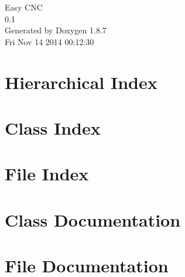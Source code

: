 \documentclass[twoside]{book}
\newcommand{\+}{\discretionary{\mbox{\scriptsize$\hookleftarrow$}}{}{}}
\newcommand{\clearemptydoublepage}{%
  \newpage{\pagestyle{empty}\cleardoublepage}%
}
\begin{document}
\hypersetup{pageanchor=false,
             bookmarks=true,
             bookmarksnumbered=true,
             pdfencoding=unicode
            }
\begin{titlepage}
\vspace*{7cm}
\begin{center}%
{\Large Easy C\+N\+C \\[1ex]\large 0.\+1 }\\
\vspace*{1cm}
{\large Generated by Doxygen 1.8.7}\\
\vspace*{0.5cm}
{\small Fri Nov 14 2014 00:12:30}\\
\end{center}
\end{titlepage}
\clearemptydoublepage
\tableofcontents
\clearemptydoublepage
{}
\hypersetup{pageanchor=true}

\chapter{Hierarchical Index}

\chapter{Class Index}

\chapter{File Index}

\chapter{Class Documentation}










\chapter{File Documentation}
























\newpage
{}
{}
\printindex
\end{document}
